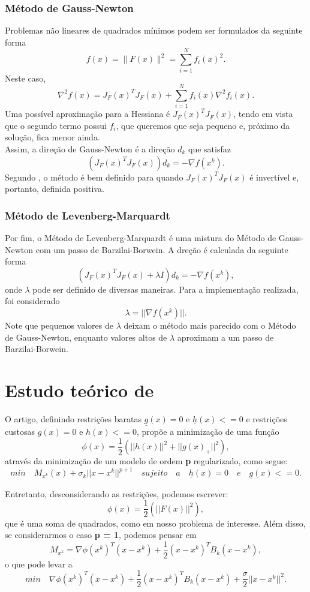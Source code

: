 \documentclass[11pt]{article}
\begin{document}
\subsubsection*{Método de Gauss-Newton}
Problemas não lineares de quadrados mínimos podem ser formulados da seguinte forma 
$$f(x)=\|F(x)\|^2=\sum_{i=1}^N f_i(x)^2.$$
Neste caso, $$\nabla^2 f(x)= J_F(x)^T J_F(x)+\sum_{i=1}^N f_i(x) \nabla^2 f_i(x).$$
Uma possível aproximação para a Hessiana é $J_F(x)^T J_F(x)$, tendo em vista que o segundo termo possui $f_i$, que queremos que seja pequeno e, próximo da solução, fica menor ainda. \\


\noindent
Assim, a direção de Gauss-Newton é a direção $d_k$ que satisfaz $$(J_F(x)^T J_F(x)) d_k = - \nabla f(x^k).$$
Segundo \cite{artigoLevenberg}, o método é bem definido para quando $J_F(x)^T J_F(x)$ é invertível e, portanto, definida positiva. 

\subsubsection*{Método de Levenberg-Marquardt}
Por fim, o Método de Levenberg-Marquardt é uma mistura do Método de Gauss-Newton com um passo de Barzilai-Borwein. A dreção é calculada da seguinte forma
$$(J_F(x)^T J_F(x) + \lambda I) d_k = - \nabla f(x^k),$$
onde $\lambda$ pode ser definido de diversas maneiras. Para a implementação realizada, foi considerado $$\lambda = ||\nabla f(x^k)||.$$ 
Note que pequenos valores de $\lambda$ deixam o método mais parecido com o Método de Gauss-Newton, enquanto valores altos de $\lambda$ aproximam a um passo de Barzilai-Borwein.

\section{Estudo teórico de \cite{bmLS}}
O artigo, definindo restrições baratas $\underline{g}(x) = 0$ e $\underline{h}(x) <= 0$ e restrições custosas $g(x) = 0$ e $h(x) <= 0$, propõe a minimização de uma função 
$$\phi (x) = \frac{1}{2}(||h(x)||^2 + ||g(x)_{+}||^2),$$
através da minimização de um modelo de ordem \textbf{p} regularizado, como segue:
$$min \quad M_{x^{k}}(x) + \sigma _{k}||x - x^{k}||^{p + 1} \quad sujeito\quad a \quad \underline{h}(x) = 0 \quad e \quad \underline{g}(x) <= 0.$$


\noindent
Entretanto, desconsiderando as restrições, podemos escrever:
$$\phi (x) = \frac{1}{2}(||F(x)||^2),$$ que é uma soma de quadrados, como em nosso problema de interesse. Além disso, se considerarmos o caso \textbf{p = 1}, podemos pensar em $$M_{x^k} = \nabla \phi(x^k)^T (x - x^k) + \frac{1}{2}(x - x^k)^T B_k (x - x^k),$$ o que pode levar a
$$min \quad \nabla \phi(x^k)^T (x - x^k) + \frac{1}{2}(x - x^k)^T B_k (x - x^k) + \frac{\sigma}{2} ||x - x^k||^2.$$
\end{document}
